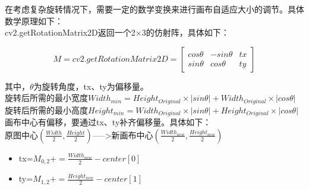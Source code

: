 \documentclass[11pt]{article}
\begin{document}
在考虑复杂旋转情况下，需要一定的数学变换来进行画布自适应大小的调节。具体数学原理如下：\\
cv2.getRotationMatrix2D返回一个2$\times$3的仿射阵，具体如下：
\begin{center}
	$$M = cv2.getRotationMatrix2D =
\begin{bmatrix}
	cos\theta & -sin\theta & tx \\
	sin\theta & cos\theta & ty
\end{bmatrix}
$$
\end{center}
其中，$\theta$为旋转角度，tx、ty为偏移量。\\
旋转后所需的最小宽度$Width_{min} = Height_{Original} \times\left | sin\theta \right | + Width_{Original} \times \left | cos\theta \right |$ \\
旋转后所需的最小高度$Height_{min} = Width_{Original} \times\left | sin\theta \right | + Height_{Original} \times \left | cos\theta \right |$\\
画布中心有偏移，要通过tx、ty补齐偏移量。具体如下：\\
原图中心$(\frac{Width}{2},\frac{Height}{2})$----->新画布中心$(\frac{Width_{new}}{2}, \frac{Height_{new}}{2})$
\begin{center}
	\begin{itemize}
	\item tx=$M_{0,2}+= \frac{Width_{new}}{2}-center[0]$
	\item ty=$M_{1,2}+=\frac{Height_{new}}{2}-center[1]$
\end{itemize}
\end{center}

    \begin{center}
    \end{center}
    
\end{document}
